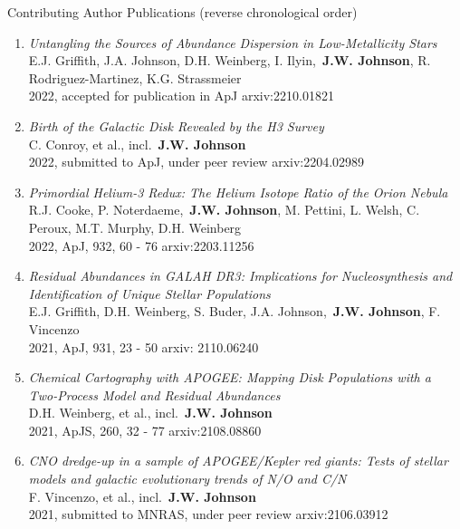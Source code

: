 \documentclass[cv.tex]{subfiles}
\begin{document}
\par\null\par\noindent
{\color{themecolor} \large Contributing Author Publications}
(reverse chronological order)
\par\noindent
\begin{enumerate}

	\vspace{-3mm}

	\item \textit{Untangling the Sources of Abundance Dispersion in
	Low-Metallicity Stars}
	\\
	E.J. Griffith, J.A. Johnson, D.H. Weinberg, I. Ilyin,~\textbf{J.W. Johnson},
	R. Rodriguez-Martinez, K.G. Strassmeier
	\\
	2022, accepted for publication in ApJ \hfill arxiv:2210.01821

	\item \textit{Birth of the Galactic Disk Revealed by the H3 Survey}
	\\
	C. Conroy, et al., incl.~\textbf{J.W. Johnson}
	\\
	2022, submitted to ApJ, under peer review \hfill arxiv:2204.02989

	\item \textit{Primordial Helium-3 Redux: The Helium Isotope Ratio of the
	Orion Nebula}
	\\
	R.J. Cooke, P. Noterdaeme,~\textbf{J.W. Johnson}, M. Pettini, L. Welsh,
	C. Peroux, M.T. Murphy, D.H. Weinberg
	\\
	2022, ApJ, 932, 60 - 76 \hfill arxiv:2203.11256

	\item \textit{Residual Abundances in GALAH DR3: Implications for
	Nucleosynthesis and Identification of Unique Stellar Populations}
	\\
	E.J. Griffith, D.H. Weinberg, S. Buder, J.A. Johnson,~\textbf{J.W. Johnson},
	F. Vincenzo
	\\
	2021, ApJ, 931, 23 - 50 \hfill arxiv: 2110.06240

	\item \textit{Chemical Cartography with APOGEE: Mapping Disk Populations
	with a Two-Process Model and Residual Abundances}
	\\
	D.H. Weinberg, et al., incl.~\textbf{J.W. Johnson}
	\\
	2021, ApJS, 260, 32 - 77 \hfill arxiv:2108.08860

	\item \textit{CNO dredge-up in a sample of APOGEE/Kepler red giants: Tests
	of stellar models and galactic evolutionary trends of N/O and C/N}
	\\
	F. Vincenzo, et al., incl.~\textbf{J.W. Johnson}
	\\
	2021, submitted to MNRAS, under peer review \hfill arxiv:2106.03912


\end{enumerate}
\end{document}
